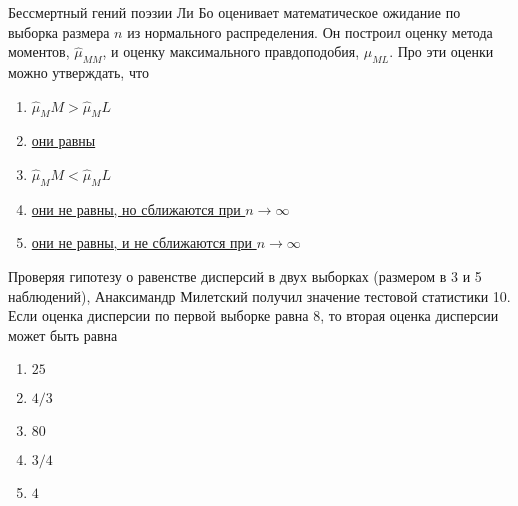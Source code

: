 \documentclass[t]{beamer}
\begin{document}
 \begin{frame} \label{53} 
\begin{block}{53} 

Бессмертный гений поэзии Ли Бо оценивает математическое ожидание  по выборка размера $n$ из нормального распределения. Он построил оценку метода моментов, $\hat{\mu}_{MM}$, и оценку максимального правдоподобия, $\hat{\mu}_{ML}$. Про эти оценки можно утверждать, что
 


 \end{block} 
\begin{enumerate} 
\item[] \hyperlink{53-No}{\beamergotobutton{}  $\hat\mu_MM>\hat\mu_ML$}
\item[] \hyperlink{53-Yes}{\beamergotobutton{} они равны}
\item[] \hyperlink{53-No}{\beamergotobutton{} $\hat\mu_MM<\hat\mu_ML$ }
\item[] \hyperlink{53-No}{\beamergotobutton{} они не равны, но сближаются при $n\to \infty$}
\item[] \hyperlink{53-No}{\beamergotobutton{} они не равны, и не сближаются при $n\to \infty$}
\end{enumerate} 
\end{frame} 


 \begin{frame} \label{54} 
\begin{block}{54} 

Проверяя гипотезу о равенстве дисперсий в двух выборках (размером в 3 и 5 наблюдений), Анаксимандр Милетский получил значение тестовой статистики 10. Если оценка дисперсии по первой выборке равна 8, то вторая оценка дисперсии может быть равна
 


 \end{block} 
\begin{enumerate} 
\item[] \hyperlink{54-No}{\beamergotobutton{} $25$}
\item[] \hyperlink{54-No}{\beamergotobutton{} $4/3$}
\item[] \hyperlink{54-Yes}{\beamergotobutton{} $80$}
\item[] \hyperlink{54-No}{\beamergotobutton{} $3/4$}
\item[] \hyperlink{54-No}{\beamergotobutton{} $4$}
\end{enumerate} 
\end{frame} 
\end{document}

